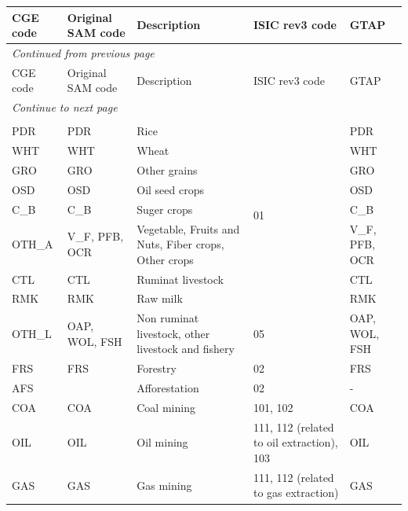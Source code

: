 \documentclass[10pt,a4paper,titlepage,dvipdfmx]{book}
\begin{document}
\begin{tabularx}{\textwidth}{|
p{}|
p{}|
p{}|
p{}|
p{}|} 
\caption{\label{tab:List of sectors} List of sectors} \\
 \hline
CGE code & Original SAM code & Description & ISIC rev3 code & GTAP \\ \hline\hline
 \endfirsthead
 \multicolumn{5}{l}{\small\it Continued from previous page}\\
 \hline
CGE code & Original SAM code & Description & ISIC rev3 code & GTAP \\ \hline\hline
 \endhead
 \hline
 \multicolumn{5}{l}{\small\it Continue to next page}\\
 \endfoot
 \hline
 \multicolumn{4}{l}{\small\it End}\\
 \endlastfoot
\hline
PDR & PDR & Rice & \multirow{8}{=}{01}  & PDR \\\cline{1-3}\cline{5-5}
WHT & WHT & Wheat &  &  WHT \\\cline{1-3}\cline{5-5}
GRO & GRO & Other grains &  &  GRO \\\cline{1-3}\cline{5-5}
OSD & OSD & Oil seed crops &  &  OSD \\\cline{1-3}\cline{5-5}
C\_B &  C\_B & Suger crops &  &  C\_B \\\cline{1-3}\cline{5-5}
OTH\_A & V\_F, PFB, OCR & Vegetable, Fruits and Nuts, Fiber crops, Other crops &  & V\_F, PFB, OCR \\\cline{1-3}\cline{5-5}
CTL & CTL & Ruminat livestock &  & CTL \\\cline{1-3}\cline{5-5}
RMK & RMK & Raw milk &  & RMK \\\hline 
OTH\_L & OAP, WOL, FSH & Non ruminat livestock, other livestock and fishery & 05 & OAP, WOL, FSH \\\hline 
FRS & FRS & Forestry & 02 & FRS \\\hline 
AFS &  & Afforestation & 02 & - \\\hline 
COA & COA & Coal mining & 101, 102 & COA \\\hline 
OIL & OIL & Oil mining & 111, 112 (related to oil extraction), 103 & OIL \\\hline 
GAS & GAS & Gas mining & 111, 112 (related to gas extraction) & GAS \\\hline 

\end{tabularx}
\end{document}
